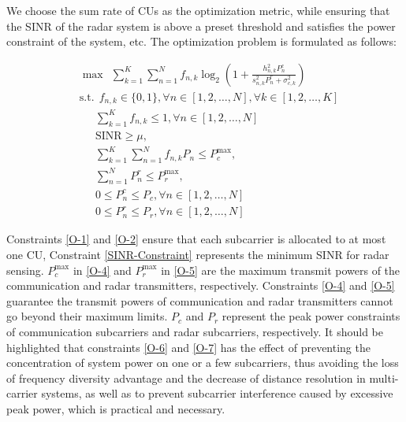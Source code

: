 \documentclass[a4paper,journal,10pt]{IEEEtran}
\begin{document}
We choose the sum rate of CUs as the optimization metric, while ensuring that the SINR of the radar system is above a preset threshold and satisfies the power constraint of the system, etc. The optimization problem is formulated as follows:
\begin{small}
    \begin{subequations}\label{Optimization Problem}
	\begin{align}
		&\max \ \  \sum_{k=1}^{K}\sum_{n=1}^{N}f_{n,k}\log_2\left(1+\frac{h_{n,k}^2P_{n}^c}{s_{n,k}^2P_{n}^r+\sigma_{c,k}^2}\right)\label{O-main} \\
		&\mathrm{s.t.}\ \ f_{n,k}\in \{ 0, 1\}, \forall n\in [1,2,\dots,N], \forall k\in [1,2,\dots,K]\label{O-1} \\
		&\quad \ \ \sum_{k=1}^{K} f_{n,k}\leq 1, \forall n \in [1,2,\dots,N] \label{O-2}\\
		&\quad \ \ \mathrm{SINR}\ge \mu ,  \label{SINR-Constraint}\\
		&\quad \ \ \sum_{k=1}^{K}\sum_{n=1}^{N} f_{n,k}P_{n}\leq P_{c}^{\max}, \label{O-4}\\
        &\quad \ \ \sum_{n=1}^{N} P_{n}^r\leq P_{r}^{\max}, \label{O-5}\\
        &\quad \ \ 0\leq P_{n}^c\leq P_c, \forall n\in  [1,2,\dots,N] \label{O-6}\\
        &\quad \ \ 0\leq P_{n}^r\leq P_r, \forall n\in  [1,2,\dots,N]\label{O-7}
	\end{align}
\end{subequations}
\end{small}
Constraints \eqref{O-1} and \eqref{O-2} ensure that each subcarrier is allocated to at most one CU, Constraint \eqref{SINR-Constraint} represents the minimum SINR for radar sensing. $P_{c}^{\max}$ in \eqref{O-4} and $P_{r}^{\max}$ in \eqref{O-5} are the maximum transmit powers of the communication and radar transmitters, respectively. Constraints \eqref{O-4} and \eqref{O-5} guarantee the transmit powers of communication and radar transmitters cannot go beyond their maximum limits. $P_c$ and $P_r$ represent the peak power constraints of communication subcarriers and radar subcarriers, respectively. It should be highlighted that constraints \eqref{O-6} and \eqref{O-7} has the effect of preventing the concentration of system power on one or a few subcarriers, thus avoiding the loss of frequency diversity advantage and the decrease of distance resolution in multi-carrier systems\cite{Sen_Tang_Nehorai_2010, Sit_Nuss_Zwick_2017}, as well as to prevent subcarrier interference caused by excessive peak power\cite{Papandreou_Antonakopoulos_2007}, which is practical and necessary.
\end{document}
